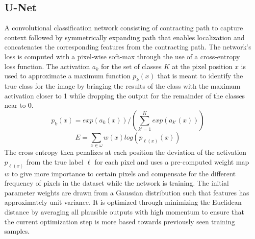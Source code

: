 \documentclass{Configuration_Files/PoliMi3i_thesis}
\begin{document}
\subsection{U-Net}
A convolutional classification network consisting of contracting path to capture context followed by symmetrically 
expanding path that enables localization \cite{OlR15} and concatenates the corresponding 
features from the contracting path. The network’s loss is computed with a pixel-wise soft-max through the 
use of a cross-entropy loss function. The activation $a_{k}$ for the set of classes $K$ at the pixel position 
$x$ is used to approximate a maximum function $p_{k}(x)$ that is meant to identify the true class for 
the image by bringing the results of the class with the maximum activation closer to 1 
while dropping the output for the remainder of the classes near to 0.
\begin{equation} \label{eq:unetact}
p_{k}(x) = exp(a_{k}(x))/(\sum_{k'=1}^K exp(a_{k'}(x)))
\end{equation}
\begin{equation} \label{eq:unetloss}
E = \sum_{x\in\omega} w(x)log(p_{\ell(x)}(x))
\end{equation}
The cross entropy then penalizes at each position the deviation of the activation $p_{\ell(x)}$ 
from the true label $\ell$ for each pixel and uses a pre-computed weight map $w$ to give more 
importance to certain pixels and compensate for the different frequency of pixels in the dataset 
while the network is training. The initial parameter weights are drawn from a Gaussian distribution 
such that features has approximately unit variance. It is optimized through minimizing the Euclidean 
distance by averaging all plausible outputs with high momentum to ensure that the current optimization 
step is more based towards previously seen training samples.
\end{document}
